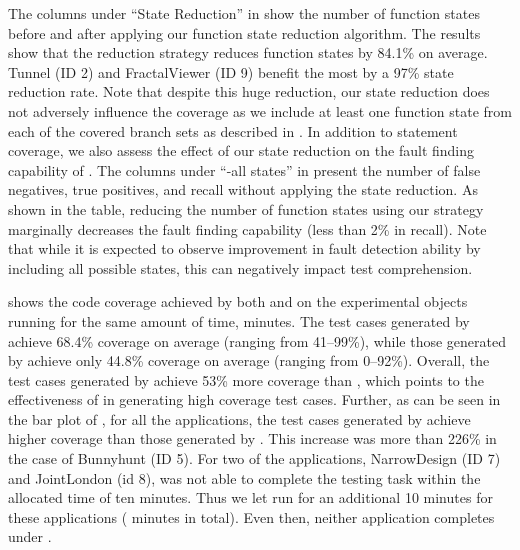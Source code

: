 The columns under ``State Reduction'' in  show the number of function states
before and after applying our function state reduction algorithm.   
The results show that the reduction strategy reduces function states by 84.1\% on average. Tunnel (ID 2) and FractalViewer (ID 9) benefit the most by a 97\% state reduction rate. 
Note that despite this huge reduction, our state reduction does not adversely influence the coverage as we include at least one function state from each of the covered branch sets as described in . In addition to statement coverage, we also assess the effect of our state reduction on the fault finding capability of \tool. The columns under ``\tool-all states'' in  present the number of false negatives, true positives, and recall without applying the state reduction. As shown in the table, reducing the number of function states using our strategy marginally decreases the fault finding capability (less than 2\% in recall). Note that while it is expected to observe improvement in fault detection ability by including all possible states, this can negatively impact test comprehension. 

 shows the code coverage achieved by  both \tool and \artemis on the experimental objects running for the same amount of time,  minutes.
The test cases generated by \tool achieve 68.4\% coverage on average (ranging from 41--99\%), while those generated by \artemis achieve only 44.8\% coverage on average (ranging from 0--92\%).
Overall, the test cases generated by \tool achieve 53\% more coverage than \artemis, which points to the effectiveness of \tool in generating high coverage test cases. 
Further, as can be seen in the bar plot of , for all the applications, the test cases generated by \tool achieve higher coverage than those generated by \artemis. 
This increase was more than 226\% in the case of Bunnyhunt (ID 5). %
For two of the applications, NarrowDesign (ID 7) and JointLondon (id 8), \artemis was not able to complete the testing task within the allocated time of ten minutes.
Thus we let \artemis run for an additional 10 minutes for these applications ( minutes in total). Even then, neither application completes under \artemis. 

